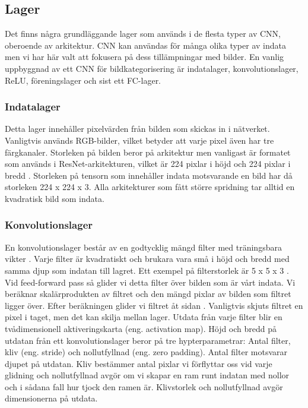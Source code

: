 \documentclass[]{kththesis}
\begin{document}
\subsection{Lager}
Det finns några grundläggande lager som används i de flesta typer av CNN, oberoende av arkitektur. CNN kan användas för många olika typer av indata men vi har här valt att fokusera på dess tillämpningar med bilder. En vanlig uppbyggnad av ett CNN för bildkategorisering är indatalager, konvolutionslager, ReLU, föreningslager och sist ett FC-lager.

\subsubsection{Indatalager}
Detta lager innehåller pixelvärden från bilden som skickas in i nätverket. Vanligtvis används RGB-bilder, vilket betyder att varje pixel även har tre färgkanaler. Storleken på bilden beror på arkitektur men vanligast är formatet som används i ResNet-arkitekturen, vilket är 224 pixlar i höjd och 224 pixlar i bredd \parencite{krizhevsky2012imagenet}. Storleken på tensorn som innehåller indata motsvarande en bild har då storleken 224 x 224 x 3. Alla arkitekturer som fått större spridning tar alltid en kvadratisk bild som indata.

\subsubsection{Konvolutionslager}
En konvolutionslager består av en godtycklig mängd filter med träningsbara vikter \parencite{lecun1995convolutional}. Varje filter är kvadratiskt och brukara vara små i höjd och bredd med samma djup som indatan till lagret. Ett exempel på filterstorlek är 5 x 5 x 3 \parencite{krizhevsky2012imagenet}. Vid feed-forward pass så glider vi detta filter över bilden som är vårt indata. Vi beräknar skalärprodukten av filtret och den mängd pixlar av bilden som filtret ligger över. Efter beräkningen glider vi filtret åt sidan \parencite{he2015spatial}. Vanligtvis skjuts filtret en pixel i taget, men det kan skilja mellan lager. Utdata från varje filter blir en tvådimensionell aktiveringskarta (eng. activation map). Höjd och bredd på utdatan från ett konvolutionslager beror på tre hypterparametrar: Antal filter, kliv (eng. stride) och nollutfyllnad (eng. zero padding). Antal filter motsvarar djupet på utdatan. Kliv bestämmer antal pixlar vi förflyttar oss vid varje glidning och nollutfyllnad avgör om vi skapar en ram runt indatan med nollor och i sådana fall hur tjock den ramen är. Klivstorlek och nollutfyllnad avgör dimensionerna på utdata.
\end{document}
